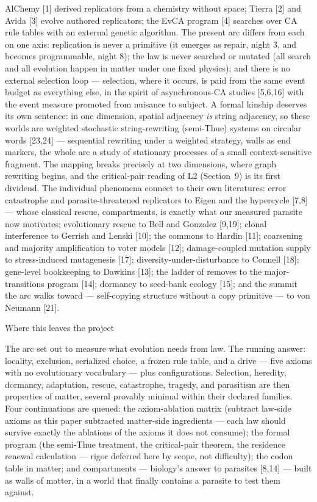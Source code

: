 AlChemy [1] derived replicators from a chemistry without space;
Tierra [2] and Avida [3] evolve authored replicators; the EvCA
program [4] searches over CA rule tables with an external genetic
algorithm. The present arc differs from each on one axis:
replication is never a primitive (it emerges as repair, night 3,
and becomes programmable, night 8); the law is never searched or
mutated (all search and all evolution happen in matter under one
fixed physics); and there is no external selection loop ---
selection, where it occurs, is paid from the same event budget as
everything else, in the spirit of asynchronous-CA studies [5,6,16]
with the event measure promoted from nuisance to subject. A
formal kinship deserves its own sentence: in one dimension,
spatial adjacency {\it is} string adjacency, so these worlds are
weighted stochastic string-rewriting (semi-Thue) systems on
circular words [23,24] --- sequential rewriting under a weighted
strategy, walls as end markers, the whole arc a study of
stationary processes of a small context-sensitive fragment. The
mapping breaks precisely at two dimensions, where graph rewriting
begins, and the critical-pair reading of L2 (Section~9) is its
first dividend. The individual phenomena connect to their own
literatures: error
catastrophe and parasite-threatened replicators to Eigen and the
hypercycle [7,8] --- whose classical rescue, compartments, is
exactly what our measured parasite now motivates; evolutionary
rescue to Bell and Gonzalez [9,19]; clonal interference to Gerrish
and Lenski [10]; the commons to Hardin [11]; coarsening and
majority amplification to voter models [12]; damage-coupled
mutation supply to stress-induced mutagenesis [17];
diversity-under-disturbance to Connell [18]; gene-level
bookkeeping to Dawkins [13]; the ladder of removes to the
major-transitions program [14]; dormancy to seed-bank ecology
[15]; and the summit the arc walks toward --- self-copying
structure without a copy primitive --- to von Neumann [21].

\sec Where this leaves the project

The arc set out to measure what evolution needs from law. The
running answer: locality, exclusion, serialized choice, a frozen
rule table, and a drive --- five axioms with no evolutionary
vocabulary --- plus configurations. Selection, heredity, dormancy,
adaptation, rescue, catastrophe, tragedy, and parasitism are then
properties of matter, several provably minimal within their
declared families. Four continuations are queued: the axiom-ablation matrix
(subtract law-side axioms as this paper subtracted matter-side
ingredients --- each law should survive exactly the ablations of
the axioms it does not consume); the formal program (the
semi-Thue treatment, the critical-pair theorem, the residence
renewal calculation --- rigor deferred here by scope, not
difficulty); the codon table in matter; and compartments ---
biology's answer to parasites [8,14] --- built as walls of
matter, in a world that finally contains a parasite to test them
against.

